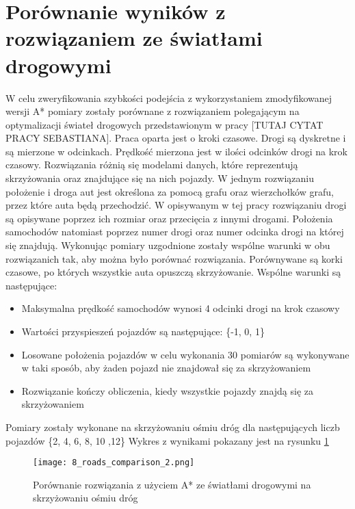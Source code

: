 \section{Porównanie wyników z rozwiązaniem ze światłami drogowymi}

W celu zweryfikowania szybkości podejścia z wykorzystaniem zmodyfikowanej wersji A* pomiary zostały porównane z rozwiązaniem polegającym na optymalizacji świateł drogowych przedstawionym w pracy [TUTAJ CYTAT PRACY SEBASTIANA]. 
\newline
\newline
Praca oparta jest o kroki czasowe. Drogi są dyskretne i są mierzone w odcinkach. Prędkość mierzona jest w ilości odcinków drogi na krok czasowy.
\newline
\newline
Rozwiązania różnią się modelami danych, które reprezentują skrzyżowania oraz znajdujące się na nich pojazdy. W jednym rozwiązaniu położenie i droga aut jest określona za pomocą grafu oraz wierzchołków grafu, przez które auta będą przechodzić. W opisywanym w tej pracy rozwiązaniu drogi są opisywane poprzez ich rozmiar oraz przecięcia z innymi drogami. Położenia samochodów natomiast poprzez numer drogi oraz numer odcinka drogi na której się znajdują.
\newline
\newline
Wykonując pomiary uzgodnione zostały wspólne warunki w obu rozwiązanich tak, aby można było porównać rozwiązania. Porównywane są korki czasowe, po których wszystkie auta opuszczą skrzyżowanie. Wspólne warunki są następujące:
\begin{itemize}
\item Maksymalna prędkość samochodów wynosi 4 odcinki drogi na krok czasowy
\item Wartości przyspieszeń pojazdów są następujące: \{-1, 0, 1\}
\item Losowane położenia pojazdów w celu wykonania 30 pomiarów są wykonywane w taki sposób, aby żaden pojazd nie znajdował się za skrzyżowaniem
\item Rozwiązanie kończy obliczenia, kiedy wszystkie pojazdy znajdą się za skrzyżowaniem
\end{itemize}
Pomiary zostały wykonane na skrzyżowaniu ośmiu dróg dla następujących liczb pojazdów \{2, 4, 6, 8, 10 ,12\}
\newline
\newline
Wykres z wynikami pokazany jest na rysunku \ref{comparison}
\begin{figure}[H]
  \texttt{[image: 8\_roads\_comparison\_2.png]}
  \caption{Porównanie rozwiązania z użyciem A* ze światłami drogowymi na skrzyżowaniu ośmiu dróg}
  \label{comparison}
\end{figure}
